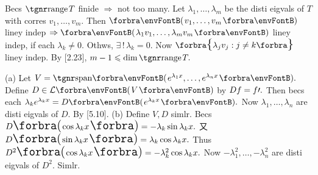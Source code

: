 Becs $\range T$ finide $\Rightarrow$ not too many. Let $\lambda_1,\dots,\lambda_m$ be the disti eigvals of $T$ with corres $v_1,\dots,v_m.$\parSol{}
Then $\Par{v_1,\dots,v_m}$ liney indep $\Rightarrow\Par{\lambda_1 v_1,\dots,\lambda_m v_m}$ liney indep, if each $\lambda_k\neq 0.$ \;Othws,\parSol{}
$\exists\,!\,\lambda_k=0.$ Now $\Bra{\lambda_jv_j:j\neq k}$ liney indep. By [2.23], $m-1\leqslant\dim\range T.$\PfEnd
\SepLine



(a) Let $V=\Span{e^{\lambda_1x},\dots,e^{\lambda_nx}}.$ Define $D\in\Lm{V}$ by $Df=f\prime.$\parSol{\Ha}
Then becs each $\lambda_k e^{\lambda_k x}=D\Par{e^{\lambda_k x}}.$ Now $\lambda_1,\dots,\lambda_n$ are disti eigvals of $D.$ By [5.10].\PfEnd\vspace{2pt}\parSol{}
(b) %
Define $V,D$ simlr. Becs $D\BigPar{\!\cos{\lambda_k x}}=-\lambda_k\sin{\lambda_k x}.$ 又 $D\BigPar{\!\sin{\lambda_k x}}=\lambda_k\cos{\lambda_k x}.$\parSol{\Hb}
Thus $D^2\BigPar{\!\cos{\lambda_k x}}=-\lambda_k^2\cos{\lambda_k x}.$ Now $-\lambda_1^2,\dots,-\lambda_n^2$ are disti eigvals of $D^2.$ Simlr.\PfEnd
\SepLine

